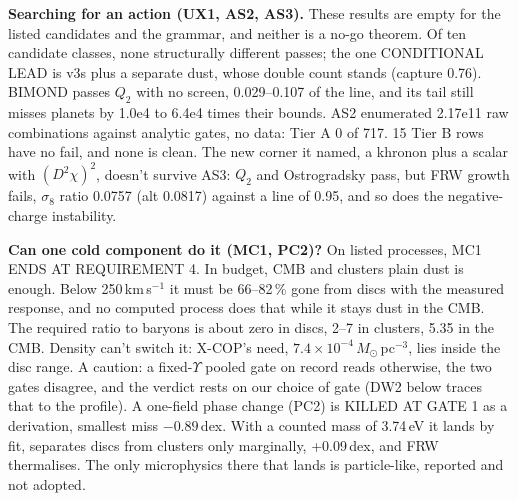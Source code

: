 \documentclass[10pt]{article}
\begin{document}
\textbf{Searching for an action (UX1, AS2, AS3).} These results are empty for the listed candidates and the grammar, and neither is a no-go theorem. Of ten candidate classes, none structurally different passes; the one CONDITIONAL LEAD is v3s plus a separate dust, whose double count stands (capture 0.76). BIMOND \cite{BM} passes $Q_2$ with no screen, 0.029--0.107 of the line, and its tail still misses planets by 1.0e4 to 6.4e4 times their bounds. AS2 enumerated 2.17e11 raw combinations against analytic gates, no data: Tier A 0 of 717. 15 Tier B rows have no fail, and none is clean. The new corner it named, a khronon plus a scalar with $(D^2\chi)^2$, doesn't survive AS3: $Q_2$ and Ostrogradsky pass, but FRW growth fails, $\sigma_8$ ratio 0.0757 (alt 0.0817) against a line of 0.95, and so does the negative-charge instability.

\textbf{Can one cold component do it (MC1, PC2)?} On listed processes, MC1 ENDS AT REQUIREMENT 4. In budget, CMB and clusters plain dust is enough. Below 250\,km\,s$^{-1}$ it must be 66--82\,\% gone from discs with the measured response, and no computed process does that while it stays dust in the CMB. The required ratio to baryons is about zero in discs, 2--7 in clusters, 5.35 in the CMB. Density can't switch it: X-COP's need, $7.4\times10^{-4}\,M_\odot$\,pc$^{-3}$, lies inside the disc range. A caution: a fixed-$\Upsilon$ pooled gate on record reads otherwise, the two gates disagree, and the verdict rests on our choice of gate (DW2 below traces that to the profile). A one-field phase change (PC2) is KILLED AT GATE 1 as a derivation, smallest miss $-0.89$\,dex. With a counted mass of 3.74\,eV it lands by fit, separates discs from clusters only marginally, +0.09\,dex, and FRW thermalises. The only microphysics there that lands is particle-like, reported and not adopted.
\end{document}
